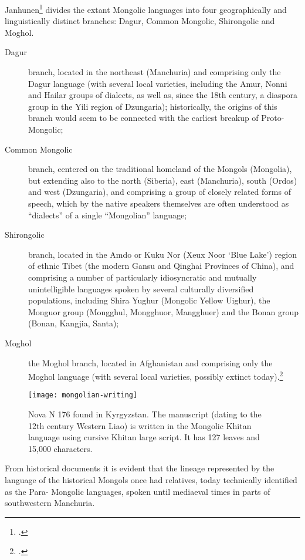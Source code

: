 Janhunen\footcite{book:janhunen2012} divides the extant Mongolic languages into four geographically
and linguistically distinct branches: Dagur, Common Mongolic,
Shirongolic and Moghol.

\begin{description}

\item[Dagur] branch, located in the northeast (Manchuria) and comprising only the
Dagur language (with several local varieties, including the Amur, Nonni and Hailar
groups of dialects, as well as, since the 18th century, a diaspora group in the Yili
region of Dzungaria); historically, the origins of this branch would seem to be connected
with the earliest breakup of Proto-Mongolic;

\item[Common Mongolic] branch, centered on the traditional homeland of the Mongols
(Mongolia), but extending also to the north (Siberia), east (Manchuria), south
(Ordos) and west (Dzungaria), and comprising a group of closely related forms of
speech, which by the native speakers themselves are often understood as “dialects”
of a single “Mongolian” language;

\item[Shirongolic] branch, located in the Amdo or Kuku Nor (Xeux Noor ‘Blue Lake’)
region of ethnic Tibet (the modern Gansu and Qinghai Provinces of China), and
comprising a number of particularly idiosyncratic and mutually unintelligible
languages spoken by several culturally diversified populations, including Shira
Yughur (Mongolic Yellow Uighur), the Monguor group (Mongghul, Mongghuor,
Mangghuer) and the Bonan group (Bonan, Kangjia, Santa);

\item[Moghol] the Moghol branch, located in Afghanistan and comprising only the Moghol language
(with several local varieties, possibly extinct today).\footcite{book:janhunen2012}
\end{description}

\begin{figure}[htbp]
\texttt{[image: mongolian-writing]}
\caption{Nova N 176 found in Kyrgyzstan. The manuscript (dating to the 12th century Western Liao) is written in the Mongolic Khitan language using cursive Khitan large script. It has 127 leaves and 15,000 characters.}
\end{figure}

From historical documents it is evident that the lineage represented by the language
of the historical Mongols once had relatives, today technically identified as the Para-
Mongolic languages, spoken until mediaeval times in parts of southwestern Manchuria.

